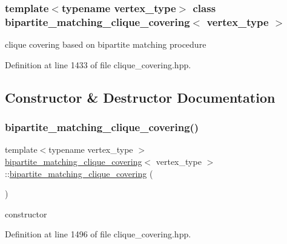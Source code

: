 \subsubsection*{template$<$typename vertex\+\_\+type$>$\newline
class bipartite\+\_\+matching\+\_\+clique\+\_\+covering$<$ vertex\+\_\+type $>$}

clique covering based on bipartite matching procedure 

Definition at line 1433 of file clique\+\_\+covering.\+hpp.



\subsection{Constructor \& Destructor Documentation}
\mbox{\label{classbipartite__matching__clique__covering_aa1a0ba14161d2bdcf6ab53169c3fffb5}} 
\subsubsection{\texorpdfstring{bipartite\+\_\+matching\+\_\+clique\+\_\+covering()}{bipartite\_matching\_clique\_covering()}}
{\footnotesize\ttfamily template$<$typename vertex\+\_\+type $>$ \\
\hyperlink{classbipartite__matching__clique__covering}{bipartite\+\_\+matching\+\_\+clique\+\_\+covering}$<$ vertex\+\_\+type $>$\+::\hyperlink{classbipartite__matching__clique__covering}{bipartite\+\_\+matching\+\_\+clique\+\_\+covering} (\begin{DoxyParamCaption}{ }\end{DoxyParamCaption})\hspace{0.3cm}{\ttfamily [inline]}}



constructor 



Definition at line 1496 of file clique\+\_\+covering.\+hpp.




